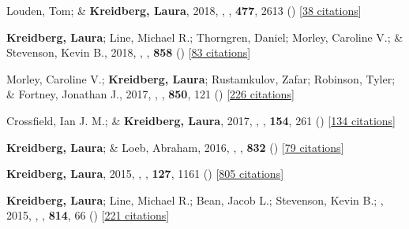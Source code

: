 \item[{\color{numcolor}\scriptsize11}] Louden, Tom; \& \textbf{Kreidberg, Laura}, 2018, , \mnras, \textbf{477}, 2613 () [\href{https://ui.adsabs.harvard.edu/abs/2018MNRAS.477.2613L}{38 citations}]

\item[{\color{numcolor}\scriptsize10}] \textbf{Kreidberg, Laura}; Line, Michael R.; Thorngren, Daniel; Morley, Caroline V.; \& Stevenson, Kevin B., 2018, , \apj, \textbf{858} () [\href{https://ui.adsabs.harvard.edu/abs/2018ApJ...858L...6K}{83 citations}]

\item[{\color{numcolor}\scriptsize9}] Morley, Caroline V.; \textbf{Kreidberg, Laura}; Rustamkulov, Zafar; Robinson, Tyler; \& Fortney, Jonathan J., 2017, , \apj, \textbf{850}, 121 () [\href{https://ui.adsabs.harvard.edu/abs/2017ApJ...850..121M}{226 citations}]

\item[{\color{numcolor}\scriptsize8}] Crossfield, Ian J. M.; \& \textbf{Kreidberg, Laura}, 2017, , \aj, \textbf{154}, 261 () [\href{https://ui.adsabs.harvard.edu/abs/2017AJ....154..261C}{134 citations}]

\item[{\color{numcolor}\scriptsize7}] \textbf{Kreidberg, Laura}; \& Loeb, Abraham, 2016, , \apj, \textbf{832} () [\href{https://ui.adsabs.harvard.edu/abs/2016ApJ...832L..12K}{79 citations}]

\item[{\color{numcolor}\scriptsize6}] \textbf{Kreidberg, Laura}, 2015, , \pasp, \textbf{127}, 1161 () [\href{https://ui.adsabs.harvard.edu/abs/2015PASP..127.1161K}{805 citations}]

\item[{\color{numcolor}\scriptsize5}] \textbf{Kreidberg, Laura}; Line, Michael R.; Bean, Jacob L.; Stevenson, Kevin B.; \etal, 2015, , \apj, \textbf{814}, 66 () [\href{https://ui.adsabs.harvard.edu/abs/2015ApJ...814...66K}{221 citations}]

